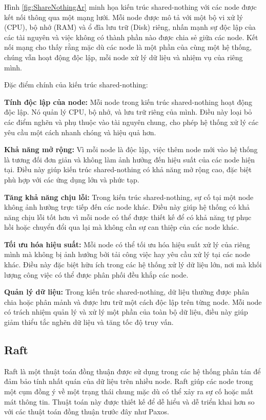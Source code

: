 \documentclass{extreport}[13.5pt, oneside,a4paper]
\begin{document}
Hình \ref{fig:ShareNothingAr} minh họa kiến trúc shared-nothing với các node được kết nối thông qua một mạng lưới. Mỗi node được mô tả với một bộ vi xử lý (CPU), bộ nhớ (RAM) và ổ đĩa lưu trữ (Disk) riêng, nhấn mạnh sự độc lập của các tài nguyên và việc không có thành phần nào được chia sẻ giữa các node. Kết nối mạng cho thấy rằng mặc dù các node là một phần của cùng một hệ thống, chúng vẫn hoạt động độc lập, mỗi node xử lý dữ liệu và nhiệm vụ của riêng mình.

Đặc điểm chính của kiến trúc shared-nothing:

\textbf{Tính độc lập của node:} Mỗi node trong kiến trúc shared-nothing hoạt động độc lập. Nó quản lý CPU, bộ nhớ, và lưu trữ riêng của mình. Điều này loại bỏ các điểm nghẽn và phụ thuộc vào tài nguyên chung, cho phép hệ thống xử lý các yêu cầu một cách nhanh chóng và hiệu quả hơn.

\textbf{Khả năng mở rộng:} Vì mỗi node là độc lập, việc thêm node mới vào hệ thống là tương đối đơn giản và không làm ảnh hưởng đến hiệu suất của các node hiện tại. Điều này giúp kiến trúc shared-nothing có khả năng mở rộng cao, đặc biệt phù hợp với các ứng dụng lớn và phức tạp.

\textbf{Tăng khả năng chịu lỗi:} Trong kiến trúc shared-nothing, sự cố tại một node không ảnh hưởng trực tiếp đến các node khác. Điều này giúp hệ thống có khả năng chịu lỗi tốt hơn vì mỗi node có thể được thiết kế để có khả năng tự phục hồi hoặc chuyển đổi qua lại mà không cần sự can thiệp của các node khác.

\textbf{Tối ưu hóa hiệu suất:} Mỗi node có thể tối ưu hóa hiệu suất xử lý của riêng mình mà không bị ảnh hưởng bởi tải công việc hay yêu cầu xử lý tại các node khác. Điều này đặc biệt hữu ích trong các hệ thống xử lý dữ liệu lớn, nơi mà khối lượng công việc có thể được phân phối đều khắp các node.

\textbf{Quản lý dữ liệu:} Trong kiến trúc shared-nothing, dữ liệu thường được phân chia hoặc phân mảnh và được lưu trữ một cách độc lập trên từng node. Mỗi node có trách nhiệm quản lý và xử lý một phần của toàn bộ dữ liệu, điều này giúp giảm thiểu tắc nghẽn dữ liệu và tăng tốc độ truy vấn.

\subsection{Raft}

Raft \cite{ongaro2014raft} là một thuật toán đồng thuận được sử dụng trong các hệ thống phân tán để đảm bảo tính nhất quán của dữ liệu trên nhiều node. Raft giúp các node trong một cụm đồng ý về một trạng thái chung mặc dù có thể xảy ra sự cố hoặc mất mát thông tin. Thuật toán này được thiết kế để dễ hiểu và dễ triển khai hơn so với các thuật toán đồng thuận trước đây như Paxos.
\end{document}
